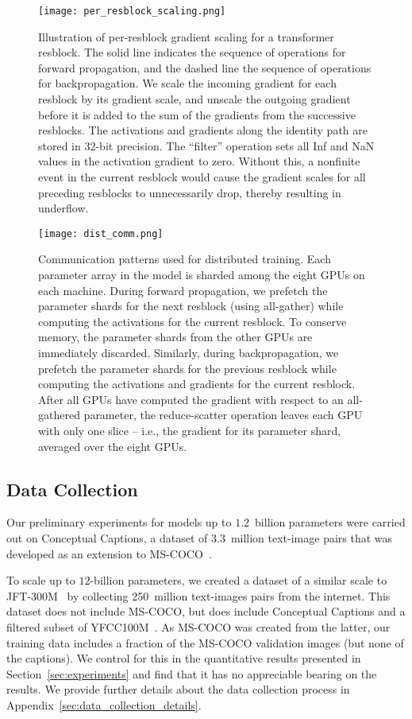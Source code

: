 \documentclass{article}
\begin{document}
\begin{figure}[t]
    \centering
    \texttt{[image: per\_resblock\_scaling.png]}
    \caption{Illustration of per-resblock gradient scaling for a transformer resblock. The solid line indicates the sequence of operations for forward propagation, and the dashed line the sequence of operations for backpropagation. We scale the incoming gradient for each resblock by its gradient scale, and unscale the outgoing gradient before it is added to the sum of the gradients from the successive resblocks. The activations and gradients along the identity path are stored in 32-bit precision. The ``filter'' operation sets all Inf and NaN values in the activation gradient to zero. Without this, a nonfinite event in the current resblock would cause the gradient scales for all preceding resblocks to unnecessarily drop, thereby resulting in underflow.}
    \label{fig:grad_scaling}
\end{figure}

\begin{figure}[t]
    \centering
    \texttt{[image: dist\_comm.png]}
    \caption{Communication patterns used for distributed training. Each parameter array in the model is sharded among the eight GPUs on each machine. During forward propagation, we prefetch the parameter shards for the next resblock (using all-gather) while computing the activations for the current resblock. To conserve memory, the parameter shards from the other GPUs are immediately discarded. Similarly, during backpropagation, we prefetch the parameter shards for the previous resblock while computing the activations and gradients for the current resblock. After all GPUs have computed the gradient with respect to an all-gathered parameter, the reduce-scatter operation leaves each GPU with only one slice -- i.e., the gradient for its parameter shard, averaged over the eight GPUs.}
    \label{fig:dist_comm}
\end{figure}

\subsection{Data Collection}
\label{sec:data_collection}

Our preliminary experiments for models up to $1.2$~billion parameters were carried out on Conceptual Captions, a dataset of 3.3~million text-image pairs that was developed as an extension to MS-COCO~\cite{lin2014microsoft}. 

To scale up to $12$-billion parameters, we created a dataset of a similar scale to JFT-300M~\cite{sun2017revisiting} by collecting 250~million text-images pairs from the internet. This dataset does not include MS-COCO, but does include Conceptual Captions and a filtered subset of YFCC100M~\cite{thomee2016yfcc100m}. As MS-COCO was created from the latter, our training data includes a fraction of the MS-COCO validation images (but none of the captions). We control for this in the quantitative results presented in Section~\ref{sec:experiments} and find that it has no appreciable bearing on the results. We provide further details about the data collection process in Appendix~\ref{sec:data_collection_details}.
\end{document}
